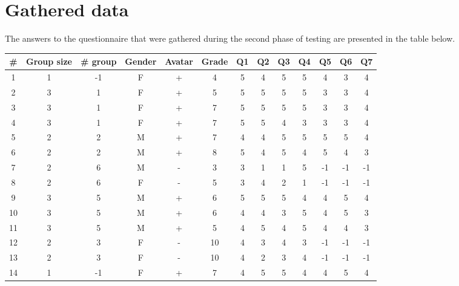 \documentclass[a4paper]{article}
\begin{document}
\section{Gathered data}

The answers to the questionnaire that were gathered during the second phase of testing are presented in the table below.

\begin{center}
  \begin{tabular}{| c | c | c | c | c | c | c | c | c | c | c | c | c |}
    \hline
    \# & Group size & \# group & Gender & Avatar & Grade & Q1 & Q2 & Q3 & Q4 & Q5 & Q6 & Q7 \\ \hline
    
    1 & 1 &	-1 & F & + & 4 & 5 & 4 & 5 & 5 & 4 & 3 & 4 \\ \hline

    2 & 3 &  1 & F & + & 5 & 5 & 5 & 5 & 5 & 3 & 3 & 4 \\ \hline

    3 & 3 & 1 & F & + & 7 & 5 & 5 & 5 & 5 & 3 & 3 & 4 \\ \hline

 	4 & 3 & 1 & F & + & 7 & 5 & 5 & 4 & 3 & 3 & 3 & 4 \\ \hline

 	5 & 2 & 2 & M & + & 7 & 4 & 4 & 5 & 5 & 5 & 5 & 4 \\ \hline

 	6 & 2 & 2 & M & + & 8 & 5 & 4 & 5 & 4 & 5 & 4 & 3 \\ \hline

 	7 & 2 & 6 & M & - & 3 & 3 & 1 & 1 & 5 & -1 & -1 & -1 \\ \hline

 	8 & 2 & 6 & F & - & 5 & 3 & 4 & 2 & 1 & -1 & -1 & -1 \\ \hline

 	9 & 3 & 5 & M & + & 6 & 5 & 5 & 5 & 4 & 4 & 5 & 4 \\ \hline

 	10 & 3 & 5 & M & + & 6 & 4 & 4 & 3 & 5 & 4 & 5 & 3 \\ \hline

 	11 & 3 & 5 & M & + & 5 & 4 & 5 & 4 & 5 & 4 & 4 & 3 \\ \hline

	12 & 2 & 3 & F & - & 10 & 4 & 3 & 4 & 3 & -1 & -1 & -1 \\ \hline

 	13 & 2 & 3 & F & - & 10 & 4 & 2 & 3 & 4 & -1 & -1 & -1 \\ \hline

 	14 & 1 & -1 & F & + & 7 & 4 & 5 & 5 & 4 & 4 & 5 & 4 \\ \hline
  \end{tabular}
\end{center}
\end{document}
